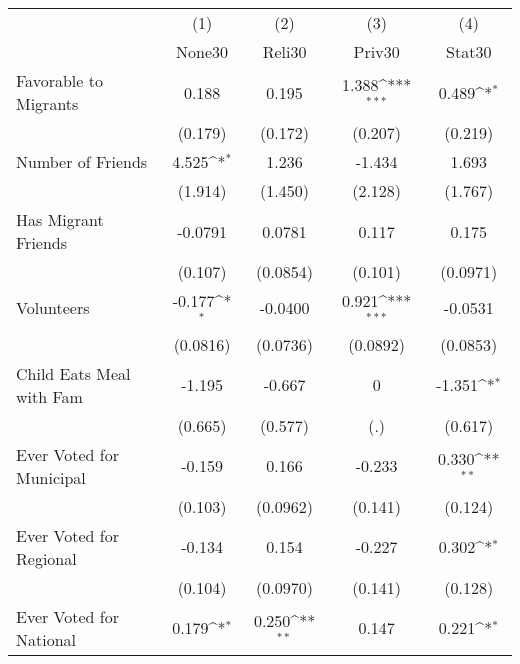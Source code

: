 {
\def\sym#1{\ifmmode^{#1}\else\(^{#1}\)\fi}
\begin{tabular}{l*{4}{c}}
\hline\hline
            &\multicolumn{1}{c}{(1)}&\multicolumn{1}{c}{(2)}&\multicolumn{1}{c}{(3)}&\multicolumn{1}{c}{(4)}\\
            &\multicolumn{1}{c}{None30}&\multicolumn{1}{c}{Reli30}&\multicolumn{1}{c}{Priv30}&\multicolumn{1}{c}{Stat30}\\
\hline
Favorable to Migrants&       0.188         &       0.195         &       1.388\sym{***}&       0.489\sym{*}  \\
            &     (0.179)         &     (0.172)         &     (0.207)         &     (0.219)         \\
[1em]
Number of Friends&       4.525\sym{*}  &       1.236         &      -1.434         &       1.693         \\
            &     (1.914)         &     (1.450)         &     (2.128)         &     (1.767)         \\
[1em]
Has Migrant Friends&     -0.0791         &      0.0781         &       0.117         &       0.175         \\
            &     (0.107)         &    (0.0854)         &     (0.101)         &    (0.0971)         \\
[1em]
Volunteers  &      -0.177\sym{*}  &     -0.0400         &       0.921\sym{***}&     -0.0531         \\
            &    (0.0816)         &    (0.0736)         &    (0.0892)         &    (0.0853)         \\
[1em]
Child Eats Meal with Fam&      -1.195         &      -0.667         &           0         &      -1.351\sym{*}  \\
            &     (0.665)         &     (0.577)         &         (.)         &     (0.617)         \\
[1em]
Ever Voted for Municipal&      -0.159         &       0.166         &      -0.233         &       0.330\sym{**} \\
            &     (0.103)         &    (0.0962)         &     (0.141)         &     (0.124)         \\
[1em]
Ever Voted for Regional&      -0.134         &       0.154         &      -0.227         &       0.302\sym{*}  \\
            &     (0.104)         &    (0.0970)         &     (0.141)         &     (0.128)         \\
[1em]
Ever Voted for National&       0.179\sym{*}  &       0.250\sym{**} &       0.147         &       0.221\sym{*}  \\

\end{tabular}}
